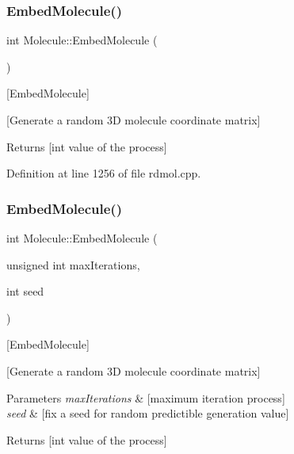 \subsubsection{\texorpdfstring{Embed\+Molecule()}{EmbedMolecule()}\hspace{0.1cm}{\footnotesize\ttfamily [1/2]}}
{\footnotesize\ttfamily int Molecule\+::\+Embed\+Molecule (\begin{DoxyParamCaption}{ }\end{DoxyParamCaption})}



\mbox{[}Embed\+Molecule\mbox{]} 

\mbox{[}Generate a random 3D molecule coordinate matrix\mbox{]}

\begin{DoxyReturn}{Returns}
\mbox{[}int value of the process\mbox{]} 
\end{DoxyReturn}


Definition at line 1256 of file rdmol.\+cpp.

\mbox{\label{class_molecule_a49385d99cee0aba8c758a1420ba7c88d}} 
\subsubsection{\texorpdfstring{Embed\+Molecule()}{EmbedMolecule()}\hspace{0.1cm}{\footnotesize\ttfamily [2/2]}}
{\footnotesize\ttfamily int Molecule\+::\+Embed\+Molecule (\begin{DoxyParamCaption}\item[{unsigned int}]{max\+Iterations,  }\item[{int}]{seed }\end{DoxyParamCaption})}



\mbox{[}Embed\+Molecule\mbox{]} 

\mbox{[}Generate a random 3D molecule coordinate matrix\mbox{]}


\begin{DoxyParams}{Parameters}
{\em max\+Iterations} & \mbox{[}maximum iteration process\mbox{]} \\
\hline
{\em seed} & \mbox{[}fix a seed for random predictible generation value\mbox{]}\\
\hline
\end{DoxyParams}
\begin{DoxyReturn}{Returns}
\mbox{[}int value of the process\mbox{]} 
\end{DoxyReturn}


